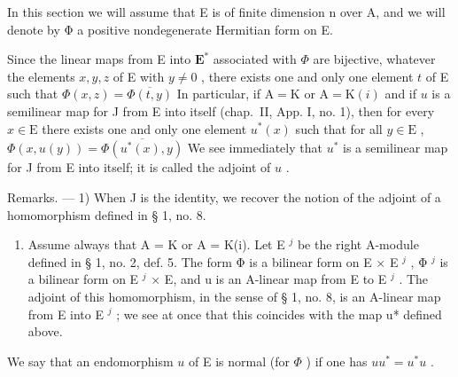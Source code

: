 In this section we will assume that E is of finite dimension n over A, and we will denote by Φ a positive nondegenerate Hermitian form on E.

Since the linear maps from E into \(\mathbf{E}^*\) associated with \(\Phi\) are bijective, whatever the elements \(x, y, z\) of E with \(y \neq 0\) , there exists one and only one element \(t\) of E such that \(\Phi(x, z) = \overline{\Phi(t, y)}\) In particular, if \(\mathrm{A} = \mathrm{K}\) or \(\mathrm{A} = \mathrm{K}(i)\) and if \(u\) is a semilinear map for J from E into itself (chap.~II, App. I, no. 1), then for every \(x \in \mathrm{E}\) there exists one and only one element \(u^*(x)\) such that for all \(y \in \mathrm{E}\) , \(\Phi(x, u(y)) = \overline{\Phi(u^*(x), y)}\) We see immediately that \(u^*\) is a semilinear map for J from E into itself; it is called the adjoint of \(u\) .

Remarks. --- 1) When J is the identity, we recover the notion of the adjoint of a homomorphism defined in § 1, no. 8.

\begin{enumerate}
\def\labelenumi{\arabic{enumi})}
\setcounter{enumi}{1}
\tightlist
\item
  Assume always that A = K or A = K(i). Let E \(^{j}\) be the right A-module defined in § 1, no. 2, def. 5. The form Φ is a bilinear form on E × E \(^{j}\) , Φ \(^{j}\) is a bilinear form on E \(^{j}\) × E, and u is an A-linear map from E to E \(^{j}\) . The adjoint of this homomorphism, in the sense of § 1, no. 8, is an A-linear map from E into E \(^{j}\) ; we see at once that this coincides with the map u* defined above.
\end{enumerate}

We say that an endomorphism \(u\) of E is normal (for \(\Phi\) ) if one has \(uu^{*}=u^{*}u\) .
